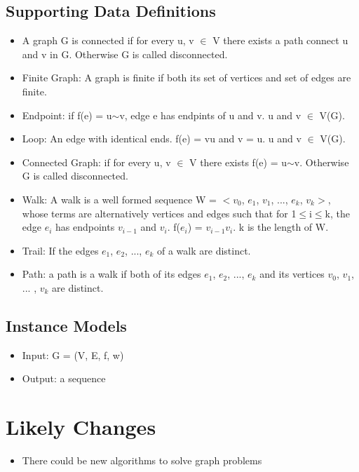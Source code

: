 \documentclass[12pt]{article}
\begin{document}
\subsection{Supporting Data Definitions}
\begin{itemize}
    \item A graph G is connected if for every u, v $\in$ V there exists a path connect u and v in G. 
    Otherwise G is called disconnected.
    \item Finite Graph: A graph is finite if both its set of vertices and set of edges are finite.
    \item Endpoint: if f(e) = u$\sim$v, edge e has endpints of u and v. u and v $\in$  V(G).
    \item Loop: An edge with identical ends. f(e) = vu and v = u. u and v $\in$  V(G).
    \item Connected Graph: if for every u, v $\in$ V there exists f(e) = u$\sim$v. Otherwise G is called disconnected.
    \item Walk: A walk is a well formed sequence W = $<v_0$, $e_1$, $v_1$, $...$, $e_k$, $v_k>$, 
    whose terms are alternatively vertices and edges such that for 1$\le$i$\le$k, 
    the edge $e_i$ has endpoints $v_{i-1}$ and $v_i$. f($e_i$) = $v_{i-1}v_i$. k is the length of W.
    \item Trail: If the edges $e_1$, $e_2$, $...$, $e_k$ of a walk are distinct.
    \item Path: a path is a walk if both of its edges $e_1$, $e_2$, $...$, $e_k$ 
    and its vertices $v_0$, $v_1$, $...$ , $v_k$ are distinct.
\end{itemize}

\subsection{Instance Models}
\begin{itemize}
    \item Input: G = (V, E, f, w)
    \item Output: a sequence
\end{itemize}

\section{Likely Changes}
\begin{itemize}
    \item There could be new algorithms to solve graph problems
\end{itemize}
\end{document}

